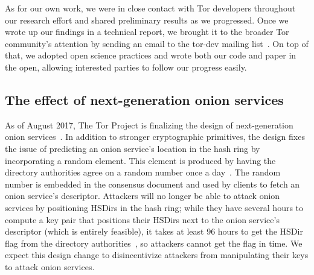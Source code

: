 As for our own work, we were in close contact with Tor developers throughout our
research effort and shared preliminary results as we progressed.  Once we wrote
up our findings in a technical report, we brought it to the broader Tor
community's attention by sending an email to the tor-dev mailing
list~\cite{Roberts2017a}.  On top of that, we adopted open science practices and
wrote both our code and paper in the open, allowing interested parties to follow
our progress easily.

\subsection{The effect of next-generation onion services}
As of August 2017, The Tor Project is finalizing the design of next-generation
onion services~\cite{prop224}.  In addition to stronger cryptographic
primitives, the design fixes the issue of predicting an onion service's location
in the hash ring by incorporating a random element.  This element is produced by
having the directory authorities agree on a random number once a
day~\cite{prop250}.  The random number is embedded in the consensus document and
used by clients to fetch an onion service's descriptor.  Attackers will no
longer be able to attack onion services by positioning HSDirs in the hash ring;
while they have several hours to compute a key pair that positions their HSDirs
next to the onion service's descriptor (which is entirely feasible), it takes at
least 96 hours to get the HSDir flag from the directory
authorities~\cite[\S~3.4.2]{dir-spec}, so attackers cannot get the flag in time.
We expect this design change to disincentivize attackers from manipulating their
keys to attack onion services.
